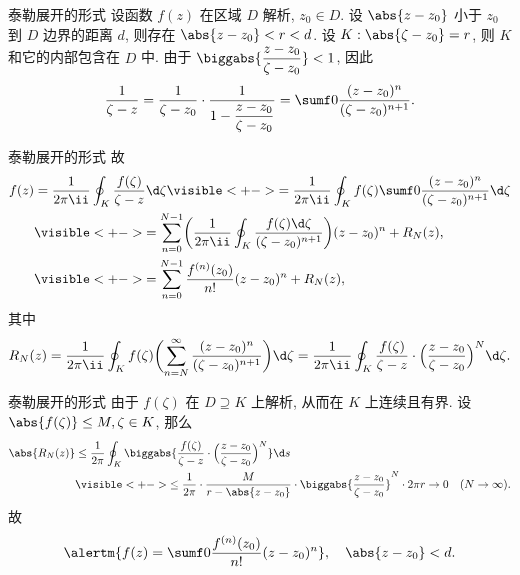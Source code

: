 \begin{frame}{泰勒展开的形式}
	\onslide<+->
	设函数 $f(z)$ 在区域 $D$ 解析, $z_0\in D$.
	\onslide<+->
	设 $\abs{z-z_0}$ 小于 $z_0$ 到 $D$ 边界的距离 $d$,
	则存在 $\abs{z-z_0}<r<d$.
	\onslide<+->
	设 $K:\abs{\zeta-z_0}=r$, 则 $K$ 和它的内部包含在 $D$ 中.
	\onslide<+->
	由于 $\biggabs{\dfrac{z-z_0}{\zeta-z_0}}<1$, 因此
	\[
		\frac1{\zeta-z}
		=\frac1{\zeta-z_0}\cdot\frac1{1-\dfrac{z-z_0}{\zeta-z_0}}
		=\sumf0\frac{(z-z_0)^n}{(\zeta-z_0)^{n+1}}.
	\]
	\onslide<1->
	\begin{center}
	\end{center}
\end{frame}


\begin{frame}{泰勒展开的形式}
	\onslide<+->
	故
	\begin{align*}
		f(z)&=\frac1{2\pi\ii}\oint_K \frac{f(\zeta)}{\zeta-z}\d\zeta
		\visible<+->{=\frac1{2\pi\ii}\oint_K f(\zeta)\sumf0\frac{(z-z_0)^n}{(\zeta-z_0)^{n+1}}\d\zeta}\\
		&\visible<+->{=
		\sum_{n=0}^{N-1}\biggl(\frac1{2\pi\ii}\oint_K\frac{f(\zeta)\d\zeta}{(\zeta-z_0)^{n+1}}\biggr)(z-z_0)^n+R_N(z),}\\
		&\visible<+->{=
		\sum_{n=0}^{N-1}\frac{f^{(n)}(z_0)}{n!}(z-z_0)^n+R_N(z),}
	\end{align*}
	\onslide<+->
	其中
	\[
		R_N(z)=\frac1{2\pi\ii}\oint_Kf(\zeta)\biggl(\sum_{n=N}^\infty\frac{(z-z_0)^n}{(\zeta-z_0)^{n+1}}\biggr)\d\zeta
		=\frac1{2\pi\ii}\oint_K\frac{f(\zeta)}{\zeta-z}\cdot\Bigl(\frac{z-z_0}{\zeta-z_0}\Bigr)^N\d\zeta.
	\]
\end{frame}


\begin{frame}{泰勒展开的形式}
	\onslide<+->
	由于 $f(\zeta)$ 在 $D\supseteq K$ 上解析, 从而在 $K$ 上连续且有界.
	\onslide<+->
	设 $\abs{f(\zeta)}\le M,\zeta\in K$,
	\onslide<+->
	那么
	\begin{align*}
		\abs{R_N(z)}&\le\frac 1{2\pi}\oint_K\biggabs{\frac{f(\zeta)}{\zeta-z}\cdot\Bigl(\frac{z-z_0}{\zeta-z_0}\Bigr)^N}\d s\\
		&\visible<+->{\le\frac 1{2\pi}\cdot \frac M{r-\abs{z-z_0}}\cdot\biggabs{\frac{z-z_0}{\zeta-z_0}}^N\cdot 2\pi r\to 0\quad (N\to\infty).}
	\end{align*}
	\onslide<+->
	故
	\[
		\alertm{f(z)=\sumf0\frac{f^{(n)}(z_0)}{n!}(z-z_0)^n},\quad \abs{z-z_0}<d.
	\]
\end{frame}


